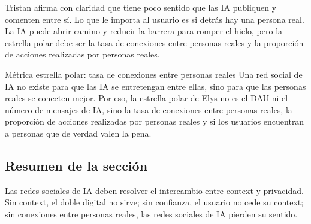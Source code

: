 Tristan afirma con claridad que tiene poco sentido que las IA publiquen y comenten entre sí. Lo que le importa al usuario es si detrás hay una persona real. La IA puede abrir camino y reducir la barrera para romper el hielo, pero la estrella polar debe ser la tasa de conexiones entre personas reales y la proporción de acciones realizadas por personas reales.

\begin{importantbox}{Métrica estrella polar: tasa de conexiones entre personas reales}
Una red social de IA no existe para que las IA se entretengan entre ellas, sino para que las personas reales se conecten mejor. Por eso, la estrella polar de Elys no es el DAU ni el número de mensajes de IA, sino la tasa de conexiones entre personas reales, la proporción de acciones realizadas por personas reales y si los usuarios encuentran a personas que de verdad valen la pena.
\end{importantbox}

\subsection{Resumen de la sección}

Las redes sociales de IA deben resolver el intercambio entre context y privacidad. Sin context, el doble digital no sirve; sin confianza, el usuario no cede su context; sin conexiones entre personas reales, las redes sociales de IA pierden su sentido.
